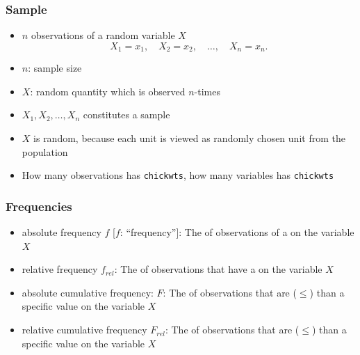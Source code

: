 \documentclass[extsize,handout,10pt]{beamer}\usepackage[]{graphicx}\usepackage[]{color}
\begin{document}
\begin{frame}
  \frametitle{Sample}
  \begin{itemize}
  \item $n$ \alert{observations} of a \alert{random variable} $X$
    \begin{equation*}
      \label{eq:Realisierung von Stichprobenvariablen}
      X_1=x_1,\quad X_2=x_2,\quad\ldots,\quad X_n=x_n.
    \end{equation*}
  \item $n$: sample size
  \item<2-> $X$: random quantity which is observed $n$-times
  \item<3-> $X_1,X_2,\ldots,X_{n}$
    constitutes a \alert{sample}
  \item<5-> $X$ is \alert{random}, because each unit is viewed as
    randomly chosen unit from
    the population
  \item How many observations has \alert{\texttt{chickwts}}, how many variables
    has \alert{\texttt{chickwts}}
  \end{itemize}
\end{frame}
    

\begin{frame}
  \frametitle{Frequencies}
  \begin{itemize}
  \item<1-> \alert{absolute frequency} $f$ [$f$: "`frequency"']: The
     of observations of a 
    on the variable $X$
  \item \alert{relative frequency} $f_{rel}$: The
     of observations that have a
     on the variable $X$
  \item<2-> \alert{absolute cumulative frequency}: $F$: The
     of observations that are  ($\leq$) than a specific value on the variable $X$
  \item \alert{relative cumulative frequency} $F_{rel}$: The
     of observations that are  ($\leq$) than a specific value on the variable $X$
  \end{itemize}
\end{frame}
\end{document}

